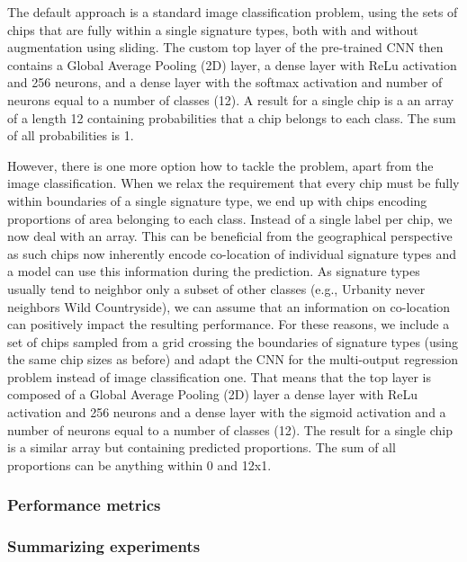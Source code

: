
The default approach is a standard image classification problem, using the sets of chips
that are fully within a single signature types, both with and without augmentation using
sliding. The custom top layer of the pre-trained CNN then contains a Global Average
Pooling (2D) layer, a dense layer with ReLu activation and 256 neurons, and a dense
layer with the softmax activation and number of neurons equal to a number of classes
(12). A result for a single chip is a an array of a length 12 containing probabilities
that a chip belongs to each class. The sum of all probabilities is 1.


However, there is one more option how to tackle the problem, apart from the image
classification. When we relax the requirement that every chip must be fully within
boundaries of a single signature type, we end up with chips encoding proportions of area
belonging to each class. Instead of a single label per chip, we now deal with an array.
This can be beneficial from the geographical perspective as such chips now inherently
encode co-location of individual signature types and a model can use this information
during the prediction. As signature types usually tend to neighbor only a subset of
other classes (e.g., Urbanity never neighbors Wild Countryside), we can assume that an
information on co-location can positively impact the resulting performance. For these
reasons, we include a set of chips sampled from a grid crossing the boundaries of
signature types (using the same chip sizes as before) and adapt the CNN for the
multi-output regression problem instead of image classification one. That means that the
top layer is composed of a Global Average Pooling (2D) layer a dense layer with ReLu
activation and 256 neurons and a dense layer with the sigmoid activation and a number of
neurons equal to a number of classes (12). The result for a single chip is a similar
array but containing predicted proportions. The sum of all proportions can be anything
within 0 and 12x1.


\subsubsection{Performance metrics}




\subsubsection{Summarizing experiments}


